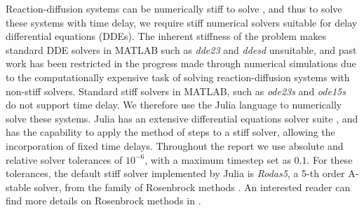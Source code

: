 Reaction-diffusion systems can be numerically stiff to solve \cite{stiff1, william}, and thus to solve these systems with time delay, we require stiff numerical solvers suitable for delay differential equations (DDEs). The inherent stiffness of the problem makes standard DDE solvers in MATLAB such as \emph{dde23} and \emph{ddesd} unsuitable, and past work has been restricted in the progress made through numerical simulations \cite{william} due to the computationally expensive task of solving reaction-diffusion systems with non-stiff solvers. Standard stiff solvers in MATLAB, such as \emph{ode23s} and \emph{ode15s} do not support time delay. We therefore use the Julia language to numerically solve these systems. Julia has an extensive differential equations solver suite \cite{rodas}, and has the capability to apply the method of steps \cite{methsteps} to a stiff solver, allowing the incorporation of fixed time delays. Throughout the report we use absolute and relative solver tolerances of $10^{-6}$, with a maximum timestep set as $0.1$. For these tolerances, the default stiff solver implemented by Julia is \emph{Rodas5}, a 5-th order A-stable solver, from the family of Rosenbrock methods \cite{rodas}. An interested reader can find more details on Rosenbrock methods in \cite{rosenbrock}.
